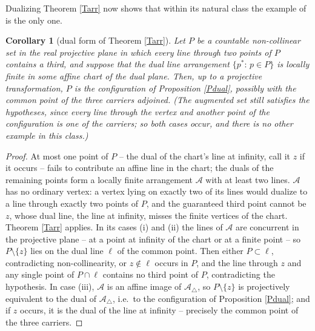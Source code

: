 \documentclass{article}
\newtheorem{corollary}{Corollary}[theorem]
\begin{document}
	Dualizing Theorem \ref{Tarr} now shows that within its natural class the example of \cite{BDSYZ} is the only one.

	\begin{corollary}[dual form of Theorem \ref{Tarr}]\label{Cdual}
		Let $P$ be a countable non-collinear set in the real projective plane in which every line through two points of $P$ contains a third, and suppose that the dual line arrangement $\{p^*:\,p\in P\}$ is locally finite in some affine chart of the dual plane. Then, up to a projective transformation, $P$ is the configuration of Proposition \ref{Pdual}, possibly with the common point of the three carriers adjoined. (The augmented set still satisfies the hypotheses, since every line through the vertex and another point of the configuration is one of the carriers; so both cases occur, and there is no other example in this class.)
	\end{corollary}

	\begin{proof}
		At most one point of $P$ -- the dual of the chart's line at infinity, call it $z$ if it occurs -- fails to contribute an affine line in the chart; the duals of the remaining points form a locally finite arrangement $\mathcal A$ with at least two lines. $\mathcal A$ has no ordinary vertex: a vertex lying on exactly two of its lines would dualize to a line through exactly two points of $P$, and the guaranteed third point cannot be $z$, whose dual line, the line at infinity, misses the finite vertices of the chart. Theorem \ref{Tarr} applies. In its cases (i) and (ii) the lines of $\mathcal A$ are concurrent in the projective plane -- at a point at infinity of the chart or at a finite point -- so $P\setminus\{z\}$ lies on the dual line $\ell$ of the common point. Then either $P\subset\ell$, contradicting non-collinearity, or $z\notin\ell$ occurs in $P$, and the line through $z$ and any single point of $P\cap\ell$ contains no third point of $P$, contradicting the hypothesis. In case (iii), $\mathcal A$ is an affine image of $\mathcal A_\triangle$, so $P\setminus\{z\}$ is projectively equivalent to the dual of $\mathcal A_\triangle$, i.e.\ to the configuration of Proposition \ref{Pdual}; and if $z$ occurs, it is the dual of the line at infinity -- precisely the common point of the three carriers.
	\end{proof}
\end{document}
